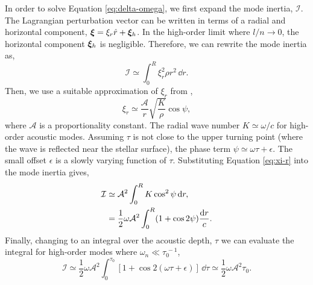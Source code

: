 \newcommand*{\propconst}{\ensuremath{{\mathcal{A}}}}

In order to solve Equation \ref{eq:delta-omega}, we first expand the mode inertia, \(\mathcal{I}\). The Lagrangian perturbation vector can be written in terms of a radial and horizontal component, \(\bm{\xi} = \xi_r \hat{r} + \bm{\xi}_h\). In the high-order limit where \(l/n \rightarrow 0\), the horizontal component \(\bm{\xi}_h\) is negligible. Therefore, we can rewrite the mode inertia as,
%
\begin{equation}
    \mathcal{I} \simeq \int_0^R \xi_r^2 \rho r^2 \, \dd r.
\end{equation}
%
Then, we use a suitable approximation of \(\xi_r\) from \citet{Gough1993}, 
%
\begin{equation}
    \xi_r \simeq \frac{\propconst}{r}\sqrt{\frac{K}{\rho}} \cos\psi,\label{eq:xi-r}
\end{equation}
%
where \(\propconst\) is a proportionality constant. The radial wave number \(K \simeq \omega / c\) for high-order acoustic modes. 
Assuming \(\tau\) is not close to the upper turning point (where the wave is reflected near the stellar surface), the phase term \(\psi \simeq \omega \tau + \epsilon\). The small offset \(\epsilon\) is a slowly varying function of \(\tau\). Substituting Equation \ref{eq:xi-r} into the mode inertia gives,
%
\begin{align}
    \mathcal{I} &\simeq \propconst^2 \int_0^R K \cos^2\psi \, \dd r, \notag \\
    &= \frac12 \omega \propconst^2 \int_0^R (1 + \cos 2 \psi) \frac{\dd r}{c}.
\end{align}
%
Finally, changing to an integral over the acoustic depth, \(\tau\) we can evaluate the integral for high-order modes where \(\omega_n \ll \tau_0^{\,-1}\),
%
\begin{equation}
    \mathcal{I} \simeq \frac12 \omega \propconst^2 \int_0^{\tau_0} [1 + \cos 2 (\omega\tau + \epsilon)] \, \dd \tau \simeq \frac12 \omega \propconst^2 \tau_0. \label{eq:inertia}
\end{equation}
%

